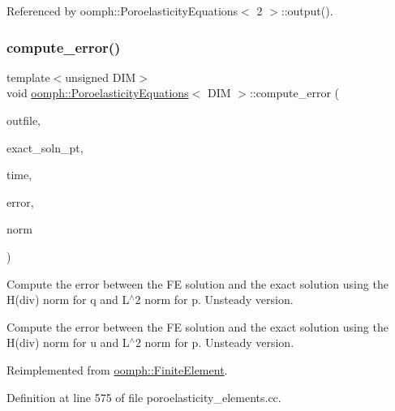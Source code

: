 Referenced by oomph\+::\+Poroelasticity\+Equations$<$ 2 $>$\+::output().

\mbox{\label{classoomph_1_1PoroelasticityEquations_acc847138fbcb1833934129ef676e03a9}} 
\subsubsection{\texorpdfstring{compute\+\_\+error()}{compute\_error()}\hspace{0.1cm}{\footnotesize\ttfamily [2/2]}}
{\footnotesize\ttfamily template$<$unsigned D\+IM$>$ \\
void \hyperlink{classoomph_1_1PoroelasticityEquations}{oomph\+::\+Poroelasticity\+Equations}$<$ D\+IM $>$\+::compute\+\_\+error (\begin{DoxyParamCaption}\item[{std\+::ostream \&}]{outfile,  }\item[{\hyperlink{classoomph_1_1FiniteElement_ad4ecf2b61b158a4b4d351a60d23c633e}{Finite\+Element\+::\+Unsteady\+Exact\+Solution\+Fct\+Pt}}]{exact\+\_\+soln\+\_\+pt,  }\item[{const double \&}]{time,  }\item[{\hyperlink{classoomph_1_1Vector}{Vector}$<$ double $>$ \&}]{error,  }\item[{\hyperlink{classoomph_1_1Vector}{Vector}$<$ double $>$ \&}]{norm }\end{DoxyParamCaption})\hspace{0.3cm}{\ttfamily [virtual]}}



Compute the error between the FE solution and the exact solution using the H(div) norm for q and L$^\wedge$2 norm for p. Unsteady version. 

Compute the error between the FE solution and the exact solution using the H(div) norm for u and L$^\wedge$2 norm for p. Unsteady version. 

Reimplemented from \hyperlink{classoomph_1_1FiniteElement_a6c1220af04b60c1a1c34b44495188daf}{oomph\+::\+Finite\+Element}.



Definition at line 575 of file poroelasticity\+\_\+elements.\+cc.

